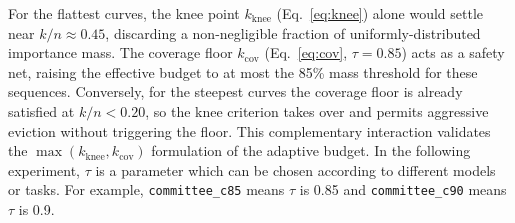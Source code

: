 \documentclass[letterpaper]{article} %
\begin{document}
For the flattest curves, the knee point
$k_\mathrm{knee}$ (Eq.~\eqref{eq:knee}) alone would settle near $k/n \approx 0.45$,
discarding a non-negligible fraction of uniformly-distributed importance mass.
The coverage floor $k_\mathrm{cov}$ (Eq.~\eqref{eq:cov}, $\tau=0.85$) acts as a
safety net, raising the effective budget to at most the 85\% mass threshold for
these sequences.  Conversely, for the steepest curves the coverage floor is
already satisfied at $k/n < 0.20$, so the knee criterion takes over and permits
aggressive eviction without triggering the floor.  This complementary interaction
validates the $\max(k_\mathrm{knee}, k_\mathrm{cov})$ formulation of the adaptive
budget. In the following experiment, $\tau$ is a parameter which can be chosen according
to different models or tasks. For example, \texttt{committee\_c85} means $\tau$ is 0.85 
and \texttt{committee\_c90} means $\tau$ is 0.9.








% 
\end{document}
